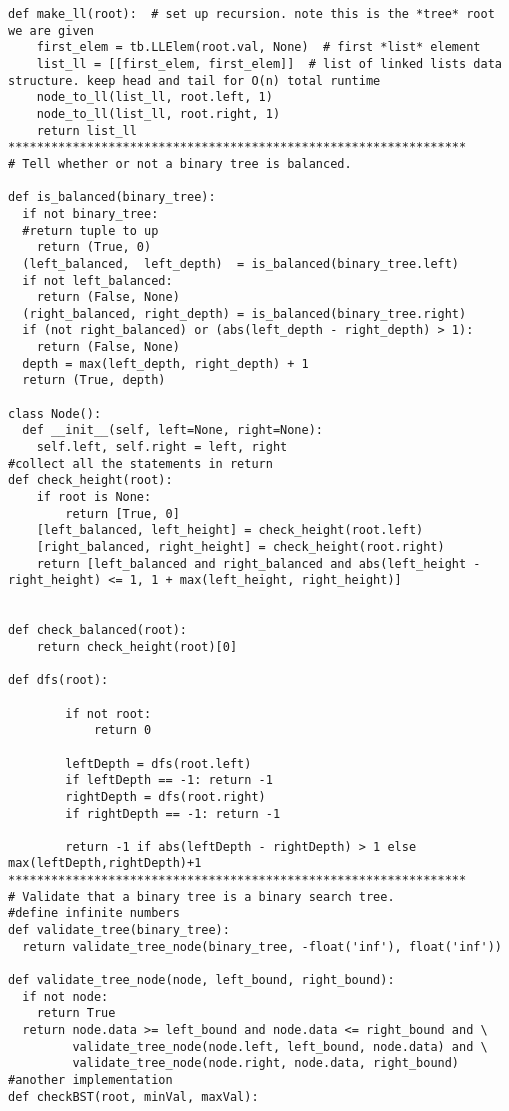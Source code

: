 \documentclass[12pt]{article}
\begin{document}
\begin{lstlisting}
def make_ll(root):  # set up recursion. note this is the *tree* root we are given
    first_elem = tb.LLElem(root.val, None)  # first *list* element
    list_ll = [[first_elem, first_elem]]  # list of linked lists data structure. keep head and tail for O(n) total runtime
    node_to_ll(list_ll, root.left, 1)
    node_to_ll(list_ll, root.right, 1)
    return list_ll
****************************************************************
# Tell whether or not a binary tree is balanced.

def is_balanced(binary_tree):
  if not binary_tree:
  #return tuple to up
    return (True, 0)
  (left_balanced,  left_depth)  = is_balanced(binary_tree.left)
  if not left_balanced:
    return (False, None)
  (right_balanced, right_depth) = is_balanced(binary_tree.right)
  if (not right_balanced) or (abs(left_depth - right_depth) > 1):
    return (False, None)
  depth = max(left_depth, right_depth) + 1
  return (True, depth)

class Node():
  def __init__(self, left=None, right=None):
    self.left, self.right = left, right
#collect all the statements in return
def check_height(root):
    if root is None:
        return [True, 0]
    [left_balanced, left_height] = check_height(root.left)
    [right_balanced, right_height] = check_height(root.right)
    return [left_balanced and right_balanced and abs(left_height - right_height) <= 1, 1 + max(left_height, right_height)]


def check_balanced(root):
    return check_height(root)[0]

def dfs(root):
        
        if not root:
            return 0
            
        leftDepth = dfs(root.left)
        if leftDepth == -1: return -1
        rightDepth = dfs(root.right)
        if rightDepth == -1: return -1
    
        return -1 if abs(leftDepth - rightDepth) > 1 else max(leftDepth,rightDepth)+1
****************************************************************
# Validate that a binary tree is a binary search tree.
#define infinite numbers
def validate_tree(binary_tree):
  return validate_tree_node(binary_tree, -float('inf'), float('inf'))

def validate_tree_node(node, left_bound, right_bound):
  if not node:
    return True
  return node.data >= left_bound and node.data <= right_bound and \
         validate_tree_node(node.left, left_bound, node.data) and \
         validate_tree_node(node.right, node.data, right_bound)
#another implementation
def checkBST(root, minVal, maxVal):
            

\end{lstlisting}
\end{document}

